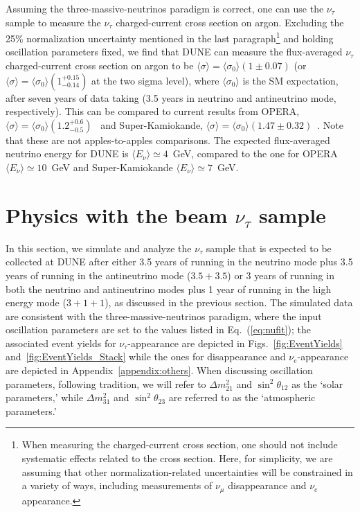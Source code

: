 \documentclass[aps,prd,onecolumn,nofootinbib,superscriptaddress, 11pt]{revtex4}
\begin{document}
Assuming the three-massive-neutrinos paradigm is correct, one can use the $\nu_{\tau}$ sample to measure the $\nu_{\tau}$ charged-current cross section on argon. Excluding the 25\% normalization uncertainty mentioned in the last paragraph\footnote{When measuring the charged-current cross section, one should not include systematic effects related to the cross section. Here, for simplicity, we are assuming that other normalization-related uncertainties will be constrained in a variety of ways, including measurements of $\nu_{\mu}$ disappearance and $\nu_e$ appearance.} and holding oscillation parameters fixed, we find that DUNE can measure the flux-averaged $\nu_{\tau}$ charged-current cross section on argon to be $\langle \sigma \rangle = \langle \sigma_0 \rangle(1 \pm 0.07)$ (or $\langle \sigma \rangle = \langle \sigma_0 \rangle(1^{+0.15}_{-0.14})$ at the two sigma level), where $ \langle \sigma_0 \rangle$ is the SM expectation, after seven years of data taking (3.5 years in neutrino and antineutrino mode, respectively). This can be compared to current results from OPERA, $\langle \sigma \rangle = \langle \sigma_0 \rangle(1.2^{+0.6}_{-0.5})$~\cite{Agafonova:2018auq} and Super-Kamiokande, $\langle \sigma \rangle = \langle \sigma_0 \rangle(1.47 \pm 0.32)$~\cite{Li:2017dbe}. Note that these are not apples-to-apples comparisons. The expected flux-averaged neutrino energy for DUNE is $\langle E_\nu \rangle \simeq 4$~GeV, compared to the one for OPERA $\langle E_\nu \rangle \simeq 10$~GeV and Super-Kamiokande $\langle E_\nu \rangle \simeq 7$~GeV.

\setcounter{equation}{0}
\section{Physics with the beam $\nu_{\tau}$ sample}

In this section, we simulate and analyze the $\nu_{\tau}$ sample that is expected to be collected at DUNE after either 3.5 years of running in the neutrino mode plus 3.5 years of running in the antineutrino mode ($3.5+3.5$) or 3 years of running in both the neutrino and antineutrino modes plus 1 year of running in the high energy mode ($3+1+1$), as discussed in the previous section. The simulated data are consistent with the three-massive-neutrinos paradigm, where the input oscillation parameters are set to the values listed in Eq.~(\ref{eq:nufit}); the associated event yields for $\nu_{\tau}$-appearance are depicted in Figs.~\ref{fig:EventYields} and~\ref{fig:EventYields_Stack} while the ones for disappearance and $\nu_e$-appearance are depicted in Appendix~\ref{appendix:others}. When discussing oscillation parameters, following tradition, we will refer to $\Delta m^2_{21}$ and $\sin^2\theta_{12}$ as the `solar parameters,' while $\Delta m^2_{31}$ and $\sin^2\theta_{23}$ are referred to as the `atmospheric parameters.'  
\end{document}
